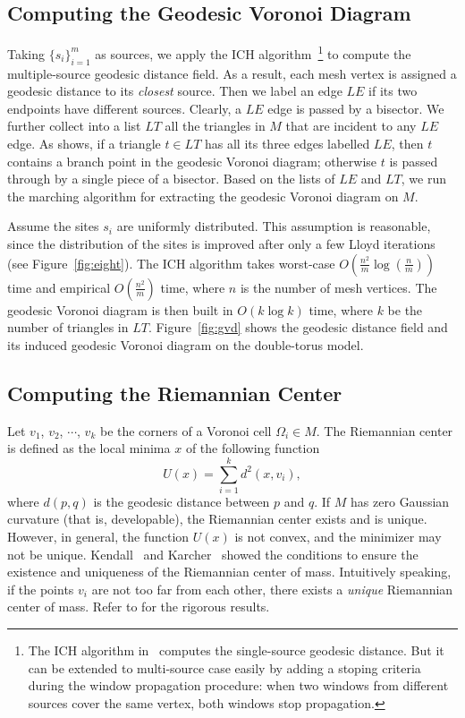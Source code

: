 \subsection{Computing the Geodesic Voronoi Diagram} \label{subsec:gvd}

Taking $\{s_i\}_{i=1}^{m}$ as sources, we apply the ICH
algorithm~\cite{Xin_Wang:2009}\footnote{The ICH algorithm
in~\cite{Xin_Wang:2009} computes the single-source geodesic
distance. But it can be extended to multi-source case easily by
adding a stoping criteria during the window propagation procedure:
when two windows from different sources cover the same vertex, both
windows stop propagation.} to compute the multiple-source geodesic
distance field. As a result, each mesh vertex is assigned a geodesic
distance to its \textit{closest} source. Then we label an edge $LE$
if its two endpoints have different sources. Clearly, a $LE$ edge is
passed by a bisector. We further collect into a list $LT$ all the
triangles in $M$ that are incident to any $LE$ edge. As \cite{Liu11}
shows, if a triangle $t\in LT$ has all its three edges labelled
$LE$, then $t$ contains a branch point in the geodesic Voronoi
diagram; otherwise $t$ is passed through by a single piece of a
bisector. Based on the lists of $LE$ and $LT$, we run the marching
algorithm \cite{Liu11} for extracting the geodesic Voronoi diagram
on $M$.

Assume the sites $s_i$ are uniformly distributed. This assumption is reasonable,
 since the distribution of the sites is improved after only a few Lloyd iterations (see Figure~\ref{fig:eight}).
 The ICH algorithm takes worst-case  $O(\frac{n^2}{m}\log(\frac{n}{m}))$ time and empirical $O(\frac{n^2}{m})$ time,
  where $n$ is the number of mesh vertices. The geodesic Voronoi diagram is then built in $O(k\log k)$ time,
  where $k$ be the number of triangles in $LT$. Figure~\ref{fig:gvd} shows the geodesic distance field and its induced geodesic Voronoi
  diagram on the double-torus model.

\subsection{Computing the Riemannian Center} \label{subsec:rieman}

Let $v_1$, $v_2$, $\cdots$, $v_k$ be the corners of a Voronoi cell $\Omega_i\in M$. The Riemannian center is defined as the local minima $x$
of the following function
\begin{equation}
U(x)=\sum_{i=1}^{k}d^2(x,v_i),
\label{eqn:ux}
\end{equation}
where $d(p,q)$ is the geodesic distance between $p$ and $q$.
If $M$ has zero Gaussian curvature (that is, developable), the Riemannian center exists and is unique. However, in general, the function $U(x)$ is not convex, and the minimizer may not be unique. Kendall~\cite{kendall} and Karcher~\cite{karcher} showed the conditions to ensure the existence and uniqueness of the Riemannian center of mass. Intuitively speaking, if the points $v_i$ are not too far from each other, there exists a \textit{unique} Riemannian center
of mass. Refer to \cite{JMIC}\cite{DBLP:journals/cgf/Rustamov10} for the rigorous results.

